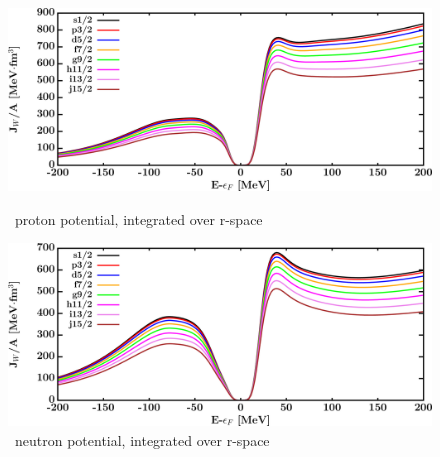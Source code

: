 \begin{figure}[H]
    \centering
    \begin{minipage}{0.45\textwidth}
        \centering
        \includegraphics[width=1.0\textwidth]{figures/sn112_protonVolumeIntegrals.png}
        \caption{\snTwelve\ proton potential, integrated over r-space}
        \label{DOMFitData_sn112_proton_potentialIntegral}
    \end{minipage}\hfill
    \begin{minipage}{0.45\textwidth}
        \centering
        \includegraphics[width=1.0\textwidth]{figures/sn112_neutronVolumeIntegrals.png}
        \caption{\snTwelve\ neutron potential, integrated over r-space}
        \label{DOMFitData_sn112_neutron_potentialIntegral}
    \end{minipage}
\end{figure}

\afterpage{\clearpage}

